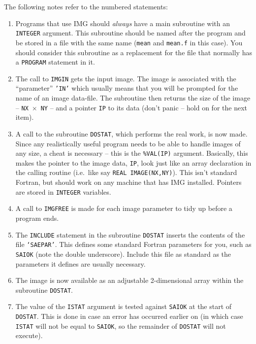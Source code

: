 \documentclass[twoside,11pt]{article}
\newcommand{\htmladdnormallink}[2]{#1}
\newcommand{\htmlref}[2]{#1}
\renewcommand{\_}{\texttt{\symbol{95}}}
\newcommand{\myverb}[1]{{\texttt{#1}}}
\newcommand{\mynote}{The following notes refer to the numbered statements:}
\newenvironment{enumnotes}
{
   \renewcommand{\labelenumi}{\myverb{[\theenumi]}}
   \begin{enumerate}
}{
   \end{enumerate}
   \renewcommand{\labelenumi}{\theenumi}
}
\renewenvironment{enumnotes}
  {
    \begin{enumerate}
  }{
    \end{enumerate}
  }
\begin{document}
\mynote
\begin{enumnotes}
\item Programs that use IMG should {\em always} have a main subroutine
with an \myverb{INTEGER} argument. This subroutine should be named
after the program and be stored in a file with the same name
(\myverb{mean} and \htmladdnormallink{\myverb{mean.f}}{../../bin/examples/img/mean.f} in this
case). You should consider this subroutine as a replacement for the
file that normally has a \myverb{PROGRAM} statement in it.

\item The call to \htmlref{\myverb{IMG\_IN}}{IMG_INnx} gets the input
image. The image is associated with the ``parameter'' \myverb{'IN'}
which usually means that you will be prompted for the name of an image
data-file.  The subroutine then returns the size of the image --
\myverb{NX}~$\times$~\myverb{NY} -- and a pointer \myverb{IP} to its
data (don't panic -- hold on for the next item).

\item A call to the subroutine \myverb{DOSTAT}, which performs the
real work, is now made. Since any realistically useful program
needs to be able to handle images of any size, a cheat is necessary
-- this is the \myverb{\%VAL(IP)} argument. Basically, this makes the
pointer to the image data, \myverb{IP}, look just like an array
declaration in the calling routine (i.e.\ like say \myverb{REAL
IMAGE(NX,NY)}).  This isn't standard Fortran, but should work on any
machine that has IMG installed. Pointers are stored in
\myverb{INTEGER} variables.

\item A call to \htmlref{\myverb{IMG\_FREE}}{IMG_FREE} is made for
each image parameter to tidy up before a program ends.

\item The \myverb{INCLUDE} statement in the subroutine \myverb{DOSTAT}
inserts the contents of the file \myverb{`SAE\_PAR'}. This defines
some standard Fortran parameters for you, such as \myverb{SAI\_\_OK}
(note the double underscore). Include this file as standard as the
parameters it defines are usually necessary.

\item The image is now available as an adjustable 2-dimensional array
within the subroutine \myverb{DOSTAT}.

\item The value of the \myverb{ISTAT} argument is tested against
\myverb{SAI\_\_OK} at the start of \myverb{DOSTAT}. This is done in case an
error has occurred earlier on (in which case \myverb{ISTAT} will not
be equal to \myverb{SAI\_\_OK}, so the remainder of \myverb{DOSTAT}
will not execute).


\end{enumnotes}
\end{document}
